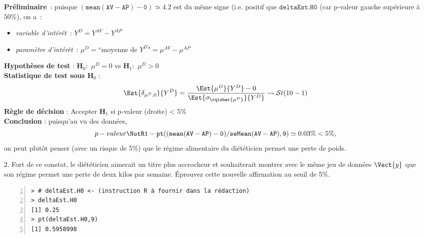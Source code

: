 \documentclass[10pt]{report}
\begin{document}
\begin{exercice}
\begin{Correction}
\noindent \textbf{Préliminaire}~: puisque  $\mathtt{(mean(AV-AP)-0)}\simeq4.2$ est du même signe (i.e. positif que $\mathtt{deltaEst.H0}$ (car p-valeur gauche supérieure à $50\%$), on a~:
    \begin{itemize}
\item \textit{variable d'intérêt}~: $Y^{D}=Y^{AV}-Y^{AP}$
\item \textit{paramètre d'intérêt}~: $\mu^{D}=\mbox{``moyenne de $Y^{D}$"}=\mu^{AV}-\mu^{AP}$
\end{itemize}
\noindent \textbf{Hypothèses de test} : $\mathbf{H}_0:$ $\mu^{D}=0$ vs {\large $\mathbf{H}_1:$ $\mu^{D}>0$}\\
\textbf{Statistique de test sous $\mathbf{H}_0$} :
  $$
  \Est{\delta_{\mu^{D},0}}{Y^{D}}= {\displaystyle \frac{\Est{\mu^{D}}{Y^{D}}-0}{
\Est{\sigma_{\cqlshat{\mu^{D}}}}{Y^{D}}
}} 
  \leadsto \mathcal{S}t(10-1)
  $$
\textbf{Règle de décision} : Accepter $\mathbf{H}_1$ si 
  p-valeur (droite) < 5\%\\
\noindent \textbf{Conclusion} :
puisqu'au vu des données, 
  \[
p-valeur\NotR\mathtt{1-pt((mean(AV-AP)-0)/seMean(AV-AP),9)} \simeq 0.03\% < 5\%,
\]
on peut plutôt penser (avec un risque de 5\%) que le régime alimentaire du diététicien permet une perte de poids.
\end{Correction}


2. Fort de ce constat, le di{\'e}t{\'e}ticien aimerait un titre plus accrocheur et souhaiterait montrer avec le m{\^e}me jeu de donn{\'e}es $\Vect{y}$ que son r{\'e}gime permet une perte de deux kilos par semaine. {\'E}prouvez cette nouvelle affirmation au seuil de 5\%.

\IndicR
\begin{Verbatim}[frame=leftline,fontfamily=tt,fontshape=n,numbers=left]
> # deltaEst.H0 <- (instruction R à fournir dans la rédaction)
> deltaEst.H0
[1] 0.25
> pt(deltaEst.H0,9)
[1] 0.5958998
\end{Verbatim}



\end{exercice}
\end{document}
